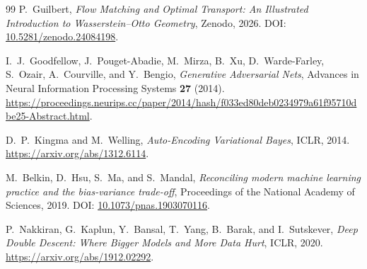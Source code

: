 \documentclass[11pt,reqno,a4paper]{amsart}
\theoremstyle{plain}
\theoremstyle{definition}
\theoremstyle{remark}
\begin{document}
\begin{thebibliography}{99}
P.~Guilbert,
\emph{Flow Matching and Optimal Transport: An Illustrated Introduction to Wasserstein--Otto Geometry},
Zenodo, 2026.
\newblock DOI: \href{https://doi.org/10.5281/zenodo.24084198}{10.5281/zenodo.24084198}.



I.~J.~Goodfellow, J.~Pouget-Abadie, M.~Mirza, B.~Xu,
D.~Warde-Farley, S.~Ozair, A.~Courville, and Y.~Bengio,
\emph{Generative Adversarial Nets},
Advances in Neural Information Processing Systems \textbf{27} (2014).
\url{https://proceedings.neurips.cc/paper/2014/hash/f033ed80deb0234979a61f95710dbe25-Abstract.html}.

D.~P.~Kingma and M.~Welling,
\emph{Auto-Encoding Variational Bayes}, ICLR, 2014.
\url{https://arxiv.org/abs/1312.6114}.

M.~Belkin, D.~Hsu, S.~Ma, and S.~Mandal,
\emph{Reconciling modern machine learning practice and the bias-variance trade-off},
Proceedings of the National Academy of Sciences, 2019.
\newblock DOI: \href{https://doi.org/10.1073/pnas.1903070116}{10.1073/pnas.1903070116}.

P.~Nakkiran, G.~Kaplun, Y.~Bansal, T.~Yang, B.~Barak, and I.~Sutskever,
\emph{Deep Double Descent: Where Bigger Models and More Data Hurt},
ICLR, 2020.
\url{https://arxiv.org/abs/1912.02292}.

\end{thebibliography}
\end{document}
